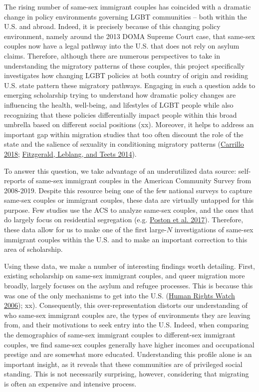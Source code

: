 \documentclass[
  11pt,
]{article}
\begin{document}
The rising number of same-sex immigrant couples has coincided with a dramatic change in policy environments governing LGBT communities -- both within the U.S. and abroad. Indeed, it is precisely because of this changing policy environment, namely around the 2013 DOMA Supreme Court case, that same-sex couples now have a legal pathway into the U.S. that does not rely on asylum claims. Therefore, although there are numerous perspectives to take in understanding the migratory patterns of these couples, this project specifically investigates how changing LGBT policies at both country of origin and residing U.S. state pattern these migratory pathways. Engaging in such a question adds to emerging scholarship trying to understand how dramatic policy changes are influencing the health, well-being, and lifestyles of LGBT people while also recognizing that these policies differentially impact people within this broad umbrella based on different social positions (xx). Moreover, it helps to address an important gap within migration studies that too often discount the role of the state and the salience of sexuality in conditioning migratory patterns (\protect\hyperlink{ref-carrillo_2018}{Carrillo 2018}; \protect\hyperlink{ref-fitzgerald_2014}{Fitzgerald, Leblang, and Teets 2014}).

To answer this question, we take advantage of an underutilized data source: self-reports of same-sex immigrant couples in the American Community Survey from 2008-2019. Despite this resource being one of the few national surveys to capture same-sex couples or immigrant couples, these data are virtually untapped for this purpose. Few studies use the ACS to analyze same-sex couples, and the ones that do largely focus on residential segregation (e.g. \protect\hyperlink{ref-poston_2017}{Poston et al. 2017}). Therefore, these data allow for us to make one of the first large-\(N\) investigations of same-sex immigrant couples within the U.S. and to make an important correction to this area of scholarship.

Using these data, we make a number of interesting findings worth detailing. First, existing scholarship on same-sex immigrant couples, and queer migration more broadly, largely focuses on the asylum and refugee processes. This is because this was one of the only mechanisms to get into the U.S. (\protect\hyperlink{ref-humanrightswatch_2006}{Human Rights Watch 2006}); xx). Consequently, this over-representation distorts our understanding of who same-sex immigrant couples are, the types of environments they are leaving from, and their motivations to seek entry into the U.S. Indeed, when comparing the demographics of same-sex immigrant couples to different-sex immigrant couples, we find same-sex couples generally have higher incomes and occupational prestige and are somewhat more educated. Understanding this profile alone is an important insight, as it reveals that these communities are of privileged social standing. This is not necessarily surprising, however, considering that migrating is often an expensive and intensive process.
\end{document}
